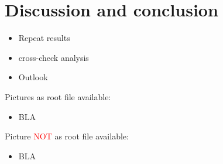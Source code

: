 \chapter{Discussion and conclusion}

\begin{itemize}
\item Repeat results
\item cross-check analysis
\item Outlook
\end{itemize}

Pictures as root file available:
\begin{itemize}
\item BLA
\end{itemize}

Picture \textcolor{red}{NOT} as root file available:
\begin{itemize}
\item BLA
\end{itemize}
